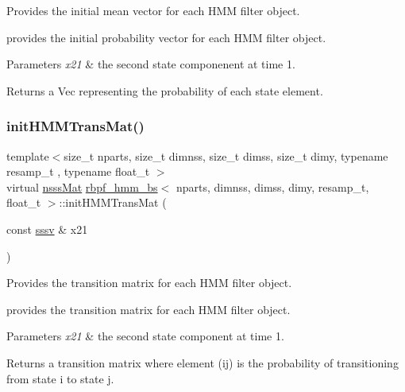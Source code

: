 Provides the initial mean vector for each H\+MM filter object. 

provides the initial probability vector for each H\+MM filter object. 
\begin{DoxyParams}{Parameters}
{\em x21} & the second state componenent at time 1. \\
\hline
\end{DoxyParams}
\begin{DoxyReturn}{Returns}
a Vec representing the probability of each state element. 
\end{DoxyReturn}
\mbox{\label{classrbpf__hmm__bs_a61a6679ada264fe9e4e0409dc93434f5}} 
\subsubsection{\texorpdfstring{init\+H\+M\+M\+Trans\+Mat()}{initHMMTransMat()}}
{\footnotesize\ttfamily template$<$size\+\_\+t nparts, size\+\_\+t dimnss, size\+\_\+t dimss, size\+\_\+t dimy, typename resamp\+\_\+t , typename float\+\_\+t $>$ \\
virtual \hyperlink{classrbpf__hmm__bs_aa6ea87fa04659348fa4e4a52b97edc5c}{nsss\+Mat} \hyperlink{classrbpf__hmm__bs}{rbpf\+\_\+hmm\+\_\+bs}$<$ nparts, dimnss, dimss, dimy, resamp\+\_\+t, float\+\_\+t $>$\+::init\+H\+M\+M\+Trans\+Mat (\begin{DoxyParamCaption}\item[{const \hyperlink{classrbpf__hmm__bs_a9a1c8d64f693a34a902dbfcb009d0f96}{sssv} \&}]{x21 }\end{DoxyParamCaption})\hspace{0.3cm}{\ttfamily [pure virtual]}}



Provides the transition matrix for each H\+MM filter object. 

provides the transition matrix for each H\+MM filter object. 
\begin{DoxyParams}{Parameters}
{\em x21} & the second state component at time 1. \\
\hline
\end{DoxyParams}
\begin{DoxyReturn}{Returns}
a transition matrix where element (ij) is the probability of transitioning from state i to state j. 
\end{DoxyReturn}
\mbox{\label{classrbpf__hmm__bs_a0d380855c79be53e452ec2bd2af122d5}} 

